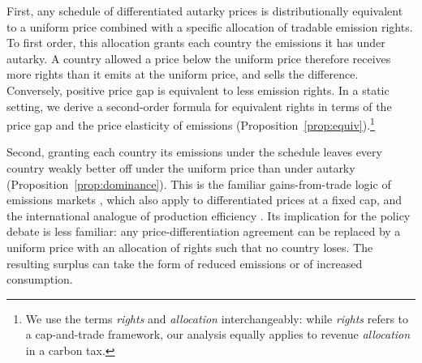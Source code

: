 \documentclass[12pt,english]{article}
\theoremstyle{remark}
\begin{document}
First, any schedule of differentiated autarky prices is distributionally equivalent to a uniform price combined with a specific allocation of tradable emission rights. To first order, this allocation grants each country the emissions it has under autarky. A country allowed a price below the uniform price therefore receives more rights than it emits at the uniform price, and sells the difference. %
Conversely,  positive price gap is equivalent to less emission rights.
In a static setting, we derive %
a second-order formula for equivalent rights in terms of the price gap and the price elasticity of emissions (Proposition~\ref{prop:equiv}).\footnote{We use the terms \textit{rights} and \textit{allocation} interchangeably: while \textit{rights} refers to a cap-and-trade framework, our analysis equally applies to revenue \textit{allocation} in a carbon tax.}

Second, granting each country its emissions under the schedule leaves every country weakly better off under the uniform price than under autarky (Proposition~\ref{prop:dominance}). This is the familiar gains-from-trade logic of emissions markets \citep{montgomery_markets_1972}, which \citet{fleurbaey_when_2025} also apply to differentiated prices at a fixed cap, and the international analogue of production efficiency \citep{diamond_optimal_1971}. Its implication for the policy debate is less familiar: any price-differentiation agreement can be replaced by a uniform price with an allocation of rights such that no country loses. The resulting surplus can take the form of reduced emissions or of increased consumption.
\end{document}
